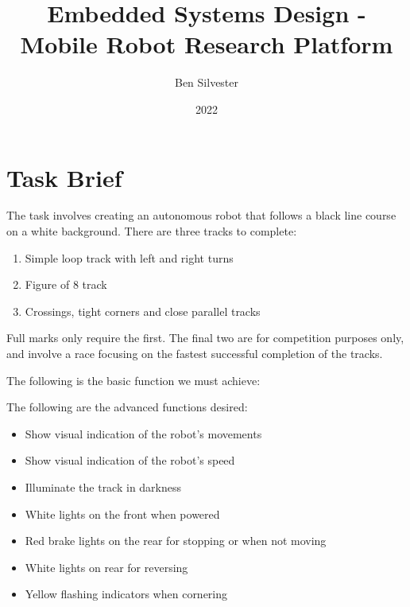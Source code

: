 \documentclass[a4paper]{report}
\begin{document}
\title{Embedded Systems Design - Mobile Robot Research Platform}
\author{Ben Silvester}
\date{2022}
\maketitle

\tableofcontents

\newpage

\chapter{Task Brief}
The task involves creating an autonomous robot that follows a black line course on a white background. There are three tracks to complete:

\begin{enumerate}
	\item Simple loop track with left and right turns
	\item Figure of 8 track
	\item Crossings, tight corners and close parallel tracks
\end{enumerate}

Full marks only require the first. The final two are for competition purposes only, and involve a race focusing on the fastest successful completion of the tracks.

\hfill \break
The following is the basic function we must achieve:

\hfill \break
\noindent{}
\hfill \break

The following are the advanced functions desired:

\begin{itemize}
	\item Show visual indication of the robot's movements
	\item Show visual indication of the robot's speed
	\item Illuminate the track in darkness
	\item White lights on the front when powered
	\item Red brake lights on the rear for stopping or when not moving
	\item White lights on rear for reversing
	\item Yellow flashing indicators when cornering
\end{itemize}
\end{document}
